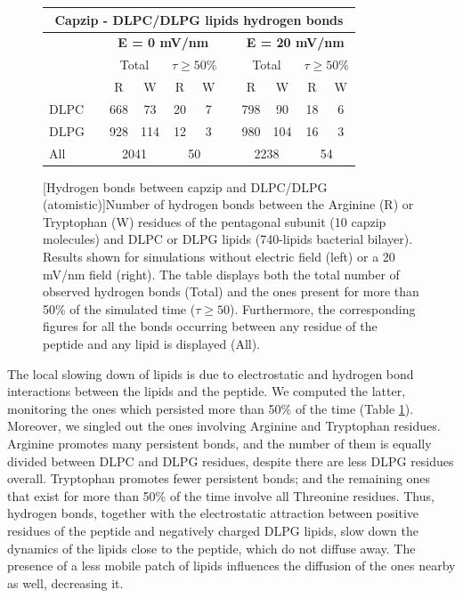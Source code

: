 \begin{figure}[p!]
\centering
 \def\arraystretch{1.6}
\begin{tabular}{lcccccccccc}
\multicolumn{11}{c}{\textbf{Capzip - DLPC/DLPG lipids hydrogen bonds}} \\
\hline
&& \multicolumn{4}{c}{\textbf{E = 0 mV/nm}} && \multicolumn{4}{c}{\textbf{E = 20 mV/nm}} \\
\hline
 && \multicolumn{2}{c}{Total} & \multicolumn{2}{c}{$\displaystyle\tau \ge 50$\%}  && \multicolumn{2}{c}{Total} & \multicolumn{2}{c}{$\displaystyle\tau \ge 50$\%} \\
\hline
  && \multicolumn{1}{c}{R} & \multicolumn{1}{c}{W} & \multicolumn{1}{c}{R} & \multicolumn{1}{c}{W} && \multicolumn{1}{c}{R} & \multicolumn{1}{c}{W} & \multicolumn{1}{c}{R} & \multicolumn{1}{c}{W} \\
 {DLPC} && 668 & 73 & 20 & 7 && 798 & 90 & 18 & 6 \\
 {DLPG} && 928 & 114 & 12 & 3 && 980 & 104 & 16 & 3 \\
 \hline
 {All} && \multicolumn{2}{c}{2041} & \multicolumn{2}{c}{50} && \multicolumn{2}{c}{2238} & \multicolumn{2}{c}{54} \\
\hline
 \end{tabular}
[Hydrogen bonds between capzip and DLPC/DLPG (atomistic)]{Number of hydrogen bonds between the Arginine (R) or Tryptophan (W) residues of the pentagonal subunit (10 capzip molecules) and DLPC or DLPG lipids (740-lipids bacterial bilayer). Results shown for simulations without electric field (left) or a 20 mV/nm field (right).
%
The table displays both the total number of observed hydrogen bonds (Total) and the ones present for more than 50\% of the simulated time ($\displaystyle\tau \ge 50$). Furthermore, the corresponding figures for all the bonds occurring between any residue of the peptide and any lipid is displayed (All).}
\label{table:hb_pr_lip}
\end{figure}

The local slowing down of lipids is due to electrostatic and hydrogen bond interactions between the lipids and the peptide. We computed the latter, monitoring the ones which persisted more than 50\% of the time (Table \ref{table:hb_pr_lip}). Moreover, we singled out the ones involving Arginine and Tryptophan residues.
%
Arginine promotes many persistent bonds, and the number of them is equally divided between DLPC and DLPG residues, despite there are less DLPG residues overall. Tryptophan promotes fewer persistent bonds; and the remaining ones that exist for more than 50\% of the time involve all Threonine residues.
%
Thus, hydrogen bonds, together with the electrostatic attraction between positive residues of the peptide and negatively charged DLPG lipids, slow down the dynamics of the lipids close to the peptide, which do not diffuse away. The presence of a less mobile patch of lipids influences the diffusion of the ones nearby as well, decreasing it.

